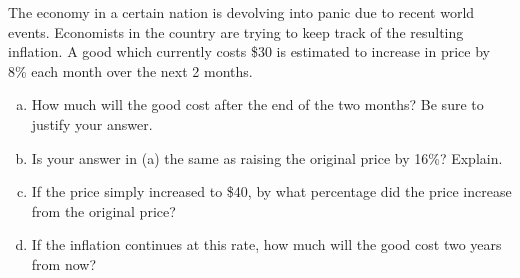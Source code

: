 \documentclass[11pt,letterpaper]{article}
\begin{document}
\newpage



 The economy in a certain nation is devolving into panic due to recent world events. Economists in the country are trying to keep track of the resulting inflation. A good which currently costs \$30 is estimated to increase in price by 8\% each month over the next 2 months. 
	\begin{enumerate}[(a)]
	\item How much will the good cost after the end of the two months? Be sure to justify your answer. 
	\item Is your answer in (a) the same as raising the original price by 16\%? Explain. 
	\item If the price simply increased to \$40, by what percentage did the price increase from the original price?
	\item If the inflation continues at this rate, how much will the good cost two years from now?	
	\end{enumerate}
\end{document}
